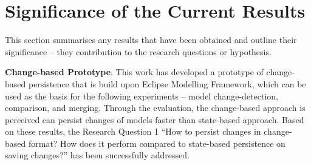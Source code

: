 \documentclass[12pt, a4paper]{report} \usepackage[titletoc]{appendix}
\begin{document}


\section{Significance of the Current Results}
\label{sec:significance_and_contribution_of_current_results}
This section summarises any results that have been obtained and outline their significance -- they contribution to the research questions or hypothesis.

\textbf{Change-based Prototype}. This work has developed a prototype of change-based persistence that is build upon Eclipse Modelling Framework, which can be used as the basis for the following experiments -- model change-detection, comparison, and merging. Through the evaluation, the change-based approach is perceived can persist changes of models faster than state-based approach. Based on these results, the Research Question 1 ``How to persist changes in change-based format? How does it perform compared to state-based persistence on saving changes?'' has been successfully addressed.
\end{document}
